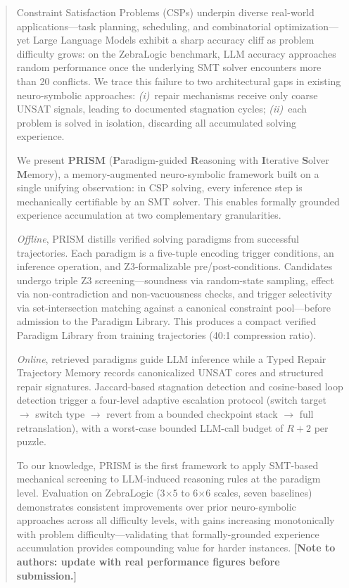 
\begin{abstract}
Constraint Satisfaction Problems (CSPs) underpin diverse real-world applications—task planning, scheduling, and combinatorial optimization—yet Large Language Models exhibit a sharp accuracy cliff as problem difficulty grows: on the ZebraLogic benchmark, LLM accuracy approaches random performance once the underlying SMT solver encounters more than 20 conflicts. We trace this failure to two architectural gaps in existing neuro-symbolic approaches: \textit{(i)}~repair mechanisms receive only coarse UNSAT signals, leading to documented stagnation cycles; \textit{(ii)}~each problem is solved in isolation, discarding all accumulated solving experience.

We present \textbf{PRISM} (\textbf{P}aradigm-guided \textbf{R}easoning with \textbf{I}terative \textbf{S}olver \textbf{M}emory), a memory-augmented neuro-symbolic framework built on a single unifying observation: in CSP solving, every inference step is mechanically certifiable by an SMT solver. This enables formally grounded experience accumulation at two complementary granularities.

\textit{Offline}, PRISM distills verified solving paradigms from successful trajectories. Each paradigm is a five-tuple encoding trigger conditions, an inference operation, and Z3-formalizable pre/post-conditions. Candidates undergo triple Z3 screening—soundness via random-state sampling, effect via non-contradiction and non-vacuousness checks, and trigger selectivity via set-intersection matching against a canonical constraint pool—before admission to the Paradigm Library. This produces a compact verified Paradigm Library from training trajectories (40:1 compression ratio).

\textit{Online}, retrieved paradigms guide LLM inference while a Typed Repair Trajectory Memory records canonicalized UNSAT cores and structured repair signatures. Jaccard-based stagnation detection and cosine-based loop detection trigger a four-level adaptive escalation protocol (switch target $\to$ switch type $\to$ revert from a bounded checkpoint stack $\to$ full retranslation), with a worst-case bounded LLM-call budget of $R+2$ per puzzle.

To our knowledge, PRISM is the first framework to apply SMT-based mechanical screening to LLM-induced reasoning rules at the paradigm level. Evaluation on ZebraLogic (3$\times$5 to 6$\times$6 scales, seven baselines) demonstrates consistent improvements over prior neuro-symbolic approaches across all difficulty levels, with gains increasing monotonically with problem difficulty—validating that formally-grounded experience accumulation provides compounding value for harder instances. \textbf{[Note to authors: update with real performance figures before submission.]}
\end{abstract}
